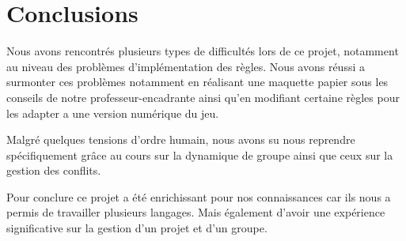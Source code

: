 \documentclass[a4paper, titlepage]{livret}
\begin{document}
 \chapter{Conclusions}
 	Nous avons rencontrés plusieurs types de difficultés lors de ce projet, notamment au niveau des problèmes d’implémentation des règles. Nous avons réussi a surmonter ces problèmes notamment en réalisant une maquette papier sous les conseils de notre professeur-encadrante ainsi qu’en modifiant certaine règles pour les adapter a une version numérique du jeu.
 	
	Malgré quelques tensions d’ordre humain, nous avons su nous reprendre spécifiquement grâce au cours sur la dynamique de groupe ainsi que ceux sur la gestion des conflits. 
	
	Pour conclure ce projet a été enrichissant pour nos connaissances car ils nous a permis de travailler plusieurs langages. Mais également d’avoir une expérience significative sur la gestion d’un projet et d’un groupe. 
\end{document}
